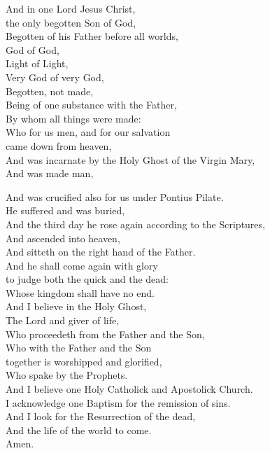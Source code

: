 And in one Lord Jesus Christ,\\
the only begotten Son of God,\\
Begotten of his Father before all worlds,\\
God of God,\\
Light of Light,\\
Very God of very God,\\
Begotten, not made,\\
Being of one substance with the Father,\\
By whom all things were made:\\
Who for us men, and for our salvation\\
came down from heaven,\\

And was incarnate by the Holy Ghost of the Virgin Mary,\\
And was made man,\\

\newpage

And was crucified also for us under Pontius Pilate.\\
He suffered and was buried,\\
And the third day he rose again according to the Scriptures,\\
And ascended into heaven,\\
And sitteth on the right hand of the Father.\\
And he shall come again with glory\\
to judge both the quick and the dead:\\
Whose kingdom shall have no end.\\

And I believe in the Holy Ghost,\\
The Lord and giver of life,\\
Who proceedeth from the Father and the Son,\\
Who with the Father and the Son\\
together is worshipped and glorified,\\
Who spake by the Prophets.\\

And I believe one Holy Catholick and Apostolick Church.\\
I acknowledge one Baptism for the remission of sins.\\
And I look for the Resurrection of the dead,\\
And the life \cross of the world to come.\\
Amen.

